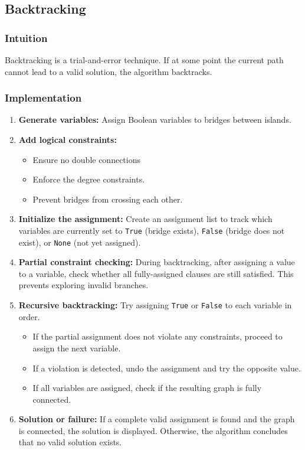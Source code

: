 \subsection{Backtracking}

\subsubsection{Intuition}
Backtracking is a trial-and-error technique. If at some point the current path cannot lead to a valid solution, the algorithm backtracks.

\subsubsection{Implementation}
\begin{enumerate}
  \item \textbf{Generate variables:} Assign Boolean variables to bridges between islands.

  \item \textbf{Add logical constraints:}
  \begin{itemize}
    \item Ensure no double connections 
    \item Enforce the degree constraints.
    \item Prevent bridges from crossing each other.
  \end{itemize}

  \item \textbf{Initialize the assignment:} 
  Create an assignment list to track which variables are currently set to \texttt{True} (bridge exists), \texttt{False} (bridge does not exist), or \texttt{None} (not yet assigned).

  \item \textbf{Partial constraint checking:} 
  During backtracking, after assigning a value to a variable, check whether all fully-assigned clauses are still satisfied. This prevents exploring invalid branches.

  \item \textbf{Recursive backtracking:}
  Try assigning \texttt{True} or \texttt{False} to each variable in order.
  \begin{itemize}
    \item If the partial assignment does not violate any constraints, proceed to assign the next variable.
    \item If a violation is detected, undo the assignment and try the opposite value.
    \item If all variables are assigned, check if the resulting graph is fully connected.
  \end{itemize}

  \item \textbf{Solution or failure:}
  If a complete valid assignment is found and the graph is connected, the solution is displayed.
  Otherwise, the algorithm concludes that no valid solution exists.
\end{enumerate}